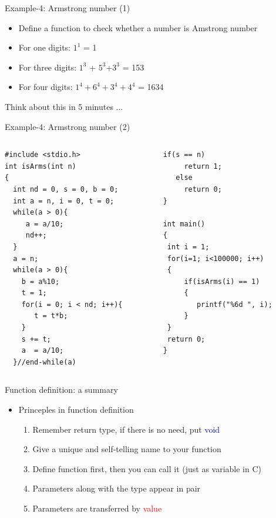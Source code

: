 \begin{frame}[fragile]{Example-4: Armstrong number (1)}
\vspace{-0.16in}
\begin{itemize}
	\item {Define a function to check whether a number is Amstrong number}
	\item {For one digits: $1^1$ = 1}
	\item {For three digits: $1^3$ + $5^3$+$3^3$ = 153}
	\item {For four digits: $1^4 + 6^4 + 3^4 + 4^4$ = 1634}
\end{itemize}
\begin{center}
	\Large{
	   Think about this in 5 minutes ...
	}
\end{center}
\end{frame}

\begin{frame}[fragile]{Example-4: Armstrong number (2)}
\vspace{-0.16in}
\begin{columns}
\begin{column}{0.48\linewidth}
\begin{lstlisting}[linewidth=0.95\linewidth]
#include <stdio.h>
int isArms(int n)
{
  int nd = 0, s = 0, b = 0;
  int a = n, i = 0, t = 0;
  while(a > 0){
     a = a/10;
     nd++;
  }
  a = n;
  while(a > 0){
    b = a%10;
    t = 1;
    for(i = 0; i < nd; i++){
       t = t*b;
    }
    s += t;
    a  = a/10;
  }//end-while(a)
\end{lstlisting}
\end{column}
\begin{column}{0.48\linewidth}
\begin{lstlisting}[firstnumber=20, linewidth=0.95\linewidth]
   if(s == n)
     return 1;
   else
     return 0;
}

int main()
{
 int i = 1;
 for(i=1; i<100000; i++)
 {
     if(isArms(i) == 1)
     {
        printf("%6d ", i);
     }
 }
 return 0;
}
\end{lstlisting}
\end{column}
\end{columns}
\end{frame}


\begin{frame}[fragile]{Function definition: a summary}
\LARGE{
\begin{itemize}
	\item {Princeples in function definition}
	\begin{enumerate}
		\item {Remember return type, if there is no need, put \textcolor{blue}{void}}
		\item {Give a unique and self-telling name to your function}
		\item {Define function first, then you can call it (just as variable in C)}
		\item {Parameters along with the type appear in pair}
		\item {Parameters are transferred by \textcolor{red}{value}}
	\end{enumerate}
\end{itemize}
}
\end{frame}

